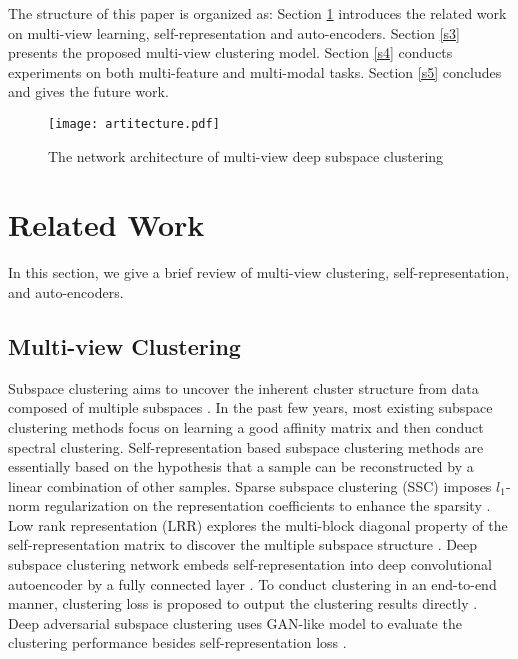 \documentclass[journal]{IEEEtran}
\begin{document}
The structure of this paper is organized as:
Section \ref{s2} introduces the related work on multi-view learning, self-representation and auto-encoders.
Section \ref{s3} presents the proposed multi-view clustering model.
Section \ref{s4} conducts experiments on both multi-feature and multi-modal tasks.
Section \ref{s5} concludes and gives the future work.

\begin{figure*}[!htbp]
	\centering
	\texttt{[image: artitecture.pdf]}
	\caption{The network architecture of multi-view deep subspace clustering}
	\label{architecture}
\end{figure*}

\section{Related Work}
\label{s2}
In this section, we give a brief review of multi-view clustering, self-representation, and auto-encoders.
\subsection{Multi-view Clustering}
Subspace clustering aims to uncover the inherent cluster structure from data composed of multiple subspaces \cite{Zhou2018DeepAS}.
In the past few years, most existing subspace clustering methods focus on learning a good affinity matrix and then conduct spectral clustering.
Self-representation based subspace clustering methods are essentially based on the hypothesis that a sample can be reconstructed by a linear combination of other samples.
Sparse subspace clustering (SSC) imposes $l_1$-norm regularization on the representation coefficients to enhance the sparsity \cite{Elhamifar2009Sparse}.
Low rank representation (LRR) explores the multi-block diagonal property of the self-representation matrix to discover the multiple subspace structure \cite{Guangcan2013Robust,Lu2018Subspace}.
Deep subspace clustering network embeds self-representation into deep convolutional autoencoder by a fully connected layer \cite{ji2017deep}.
To conduct clustering in an end-to-end manner, clustering loss is proposed to output the clustering results directly \cite{Peng2018StructuredAF}.
Deep adversarial subspace clustering uses GAN-like model to evaluate the clustering performance besides self-representation loss \cite{Zhou2018DeepAS}.
\end{document}
